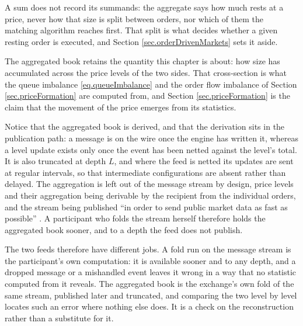 A sum does not record its summands:
the aggregate says how much rests at a price,
never how that size is split between orders,
nor which of them the matching algorithm reaches first.
That split is what decides whether a given resting order is executed,
and Section \ref{sec.orderDrivenMarkets} sets it aside.

\begin{remark}\label{remark.whyReconstruct}
 The aggregated book retains the quantity this chapter is about:
 how size has accumulated across the price levels of the two sides.
 That cross-section is what the queue imbalance \eqref{eq.queueImbalance} and the order flow
 imbalance of Section \ref{sec.priceFormation} are computed from,
 and Section \ref{sec.priceFormation} is the claim that the movement of the price emerges
 from its statistics.
\end{remark}

\begin{remark}\label{remark.derivedAndDelayed}
 Notice that the aggregated book is derived, and that the derivation sits in the
 publication path:
 a message is on the wire once the engine has written it,
 whereas a level update exists only once the event has been netted against the level's
 total.
 It is also truncated at depth $L$, and where the feed is netted its updates are sent at
 regular intervals, so that intermediate configurations are absent rather than delayed.
 The aggregation is left out of the message stream by design,
 price levels and their aggregation being derivable by the recipient from the individual
 orders, and the stream being published
 ``in order to send public market data as fast as possible''
 \cite[Section 3.1]{DBG24eob}.
 A participant who folds the stream herself therefore holds the aggregated book sooner,
 and to a depth the feed does not publish.
\end{remark}

\begin{remark}\label{remark.aggregatedAsCheck}
 The two feeds therefore have different jobs.
 A fold run on the message stream is the participant's own computation:
 it is available sooner and to any depth,
 and a dropped message or a mishandled event leaves it wrong
 in a way that no statistic computed from it reveals.
 The aggregated book is the exchange's own fold of the same stream,
 published later and truncated,
 and comparing the two level by level locates such an error where nothing else does.
 It is a check on the reconstruction rather than a substitute for it.
\end{remark}

